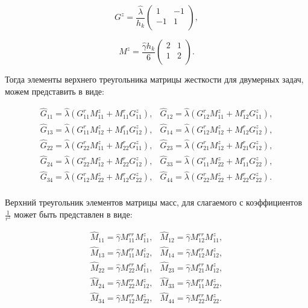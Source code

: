 \begin{equation*}
	G^z = \frac{\hat{\lambda}}{h_k} \left(
	\begin{array}{rr}
		1 & -1\\
		-1 &  1\\
	\end{array}
	\right),
\end{equation*}

\begin{equation*}
	M^z = \frac{\hat{\gamma} h_k}{6} \left(
	\begin{array}{rr}
		2 & 1\\
		1 & 2\\
	\end{array}
	\right).
\end{equation*}

Тогда элементы верхнего треугольника матрицы жесткости для двумерных задач, можем представить в виде:

\begin{equation*}
	\begin{array}{ll}
		\hat{G}_{11} = \hat{\lambda}\left(G^r_{11}M^z_{11} + M^r_{11}G^z_{11}\right), & \hat{G}_{12} = \hat{\lambda}\left(G^r_{12}M^z_{11} + M^r_{12}G^z_{11}\right),\\
		\hat{G}_{13} = \hat{\lambda}\left(G^r_{11}M^z_{12} + M^r_{11}G^z_{12}\right), & \hat{G}_{14} = \hat{\lambda}\left(G^r_{12}M^z_{12} + M^r_{12}G^z_{12}\right),\\
		\hat{G}_{22} = \hat{\lambda}\left(G^r_{22}M^z_{11} + M^r_{22}G^z_{11}\right), & \hat{G}_{23} = \hat{\lambda}\left(G^r_{21}M^z_{12} + M^r_{21}G^z_{12}\right),\\
		\hat{G}_{24} = \hat{\lambda}\left(G^r_{22}M^z_{12} + M^r_{22}G^z_{12}\right), & \hat{G}_{33} = \hat{\lambda}\left(G^r_{11}M^z_{22} + M^r_{11}G^z_{22}\right),\\
		\hat{G}_{34} = \hat{\lambda}\left(G^r_{12}M^z_{22} + M^r_{12}G^z_{22}\right), & \hat{G}_{44} = \hat{\lambda}\left(G^r_{22}M^z_{22} + M^r_{22}G^z_{22}\right).\\
	\end{array}
\end{equation*}

Верхний треугольник элементов матрицы масс, для слагаемого с коэффициентов $\frac{1}{r^2}$ может быть представлен в виде:

\begin{equation*}
	\begin{array}{ll}
		\hat{M}_{11} = \hat{\gamma}M^{rr}_{11}M^z_{11}, & \hat{M}_{12} = \hat{\gamma}M^{rr}_{12}M^z_{11},\\
		\hat{M}_{13} = \hat{\gamma}M^{rr}_{11}M^z_{12}, & \hat{M}_{14} = \hat{\gamma}M^{rr}_{12}M^z_{12},\\
		\hat{M}_{22} = \hat{\gamma}M^{rr}_{22}M^z_{11}, & \hat{M}_{23} = \hat{\gamma}M^{rr}_{21}M^z_{12},\\
		\hat{M}_{24} = \hat{\gamma}M^{rr}_{22}M^z_{12}, & \hat{M}_{33} = \hat{\gamma}M^{rr}_{11}M^z_{22},\\
		\hat{M}_{34} = \hat{\gamma}M^{rr}_{12}M^z_{22}, & \hat{M}_{44} = \hat{\gamma}M^{rr}_{22}M^z_{22}.\\
	\end{array}
\end{equation*}



